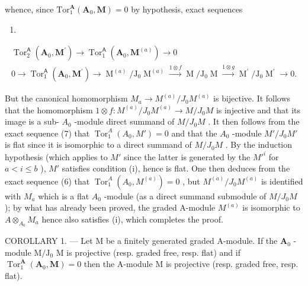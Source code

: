 whence, since \(\mathrm{Tor}_{1}^{\mathbf{A}}(\mathbf{A}_{0},\mathbf{M}) = 0\) by hypothesis, exact sequences

\begin{enumerate}
\def\labelenumi{(\arabic{enumi})}
\setcounter{enumi}{5}
\tightlist
\item
\end{enumerate}

\[
\begin{array}{c} \operatorname{Tor} _ {2} ^ {\mathsf {A}} (\mathbf {A} _ {0}, \mathbf {M} ^ {\prime}) \to \operatorname{Tor} _ {1} ^ {\mathsf {A}} (\mathbf {A} _ {0}, \mathbf {M} ^ {(a)}) \to 0 \\ 0 \to \operatorname{Tor} _ {1} ^ {\mathsf {A}} (\mathbf {A} _ {0}, \mathbf {M} ^ {\prime}) \to \operatorname{M} ^ {(a)} / \mathrm{J} _ {0} \operatorname{M} ^ {(a)} \xrightarrow {1 \otimes f} \operatorname{M} / \mathrm{J} _ {0} \operatorname{M} \xrightarrow {1 \otimes g} \operatorname{M} ^ {\prime} / \mathrm{J} _ {0} \operatorname{M} ^ {\prime} \to 0. \end{array}\tag{7}
\]

But the canonical homomorphism \(M_{a} \to M^{(a)}/J_{0} M^{(a)}\) is bijective. It follows that the homomorphism \(1 \otimes f : M^{(a)}/J_{0} M^{(a)} \to M/J_{0} M\) is injective and that its image is a sub- \(A_{0}\) -module direct summand of \(M/J_{0} M\) . It then follows from the exact sequence (7) that \(\operatorname{Tor}_{1}^{A}(A_{0}, M') = 0\) and that the \(A_{0}\) -module \(M'/J_{0} M'\) is flat since it is isomorphic to a direct summand of \(M/J_{0} M\) . By the induction hypothesis (which applies to \(M'\) since the latter is generated by the \(M'^{i}\) for \(a < i \leqslant b\) ), \(M'\) satisfies condition (i), hence is flat. One then deduces from the exact sequence (6) that \(\operatorname{Tor}_{1}^{A}(A_{0}, M^{(a)}) = 0\) , but \(M^{(a)}/J_{0} M^{(a)}\) is identified with \(M_{a}\) which is a flat \(A_{0}\) -module (as a direct summand submodule of \(M/J_{0} M\) ); by what has already been proved, the graded A-module \(M^{(a)}\) is isomorphic to \(A \otimes_{A_{0}} M_{a}\) hence also satisfies (i), which completes the proof.

COROLLARY 1. --- Let M be a finitely generated graded A-module. If the \(\mathbf{A}_0\) -module \(\mathrm{M} / \mathrm{J}_0\) M is projective (resp. graded free, resp. flat) and if \(\operatorname{Tor}_1^{\mathbf{A}}(\mathbf{A}_0, \mathbf{M}) = 0\) then the A-module M is projective (resp. graded free, resp. flat).

